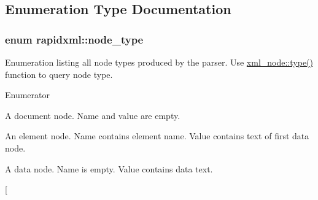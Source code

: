 \subsection{Enumeration Type Documentation}
\hypertarget{namespacerapidxml_abb456db38f7efb746c4330eed6072a7c}{
\subsubsection[{node\+\_\+type}]{\setlength{\rightskip}{0pt plus 5cm}enum {\bf rapidxml\+::node\+\_\+type}}}\label{namespacerapidxml_abb456db38f7efb746c4330eed6072a7c}
Enumeration listing all node types produced by the parser. Use \hyperlink{singletonrapidxml_1_1xml__node_a2c6a4315b98bcfa2e04fed3fa1b22c36}{xml\+\_\+node\+::type()} function to query node type. \begin{Desc}
\item[Enumerator]\par
\begin{description}
\item[{\em 
\hypertarget{namespacerapidxml_abb456db38f7efb746c4330eed6072a7ca4023b6a1c7059fd8fbec2112d5c35424}{node\+\_\+document}\label{namespacerapidxml_abb456db38f7efb746c4330eed6072a7ca4023b6a1c7059fd8fbec2112d5c35424}
}]A document node. Name and value are empty. \item[{\em 
\hypertarget{namespacerapidxml_abb456db38f7efb746c4330eed6072a7ca89cbeb4d28046326e4ee953d3c4047ff}{node\+\_\+element}\label{namespacerapidxml_abb456db38f7efb746c4330eed6072a7ca89cbeb4d28046326e4ee953d3c4047ff}
}]An element node. Name contains element name. Value contains text of first data node. \item[{\em 
\hypertarget{namespacerapidxml_abb456db38f7efb746c4330eed6072a7ca9d669d8e1f4ba9c7eeada4c14a11ad1d}{node\+\_\+data}\label{namespacerapidxml_abb456db38f7efb746c4330eed6072a7ca9d669d8e1f4ba9c7eeada4c14a11ad1d}
}]A data node. Name is empty. Value contains data text. \item[{\em 
}
\end{description}
\end{Desc}
